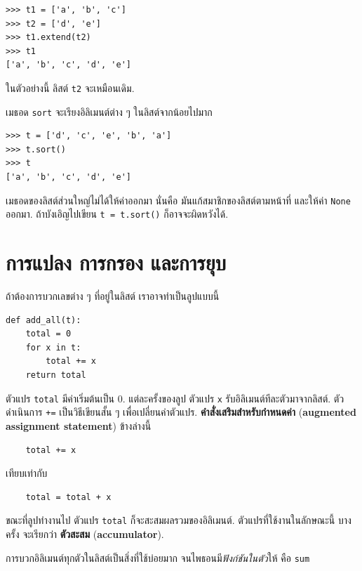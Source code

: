 \begin{verbatim}
>>> t1 = ['a', 'b', 'c']
>>> t2 = ['d', 'e']
>>> t1.extend(t2)
>>> t1
['a', 'b', 'c', 'd', 'e']
\end{verbatim}
%
ในตัวอย่างนี้ ลิสต์ \texttt{t2} จะเหมือนเดิม.

เมธอด \texttt{sort} จะเรียงอิลิเมนต์ต่าง ๆ ในลิสต์จากน้อยไปมาก

\begin{verbatim}
>>> t = ['d', 'c', 'e', 'b', 'a']
>>> t.sort()
>>> t
['a', 'b', 'c', 'd', 'e']
\end{verbatim}
%
เมธอดของลิสต์ส่วนใหญ่ไม่ได้ให้ค่าออกมา
นั่นคือ มันแก้สมาชิกของลิสต์ตามหน้าที่ และให้ค่า \texttt{None} ออกมา.
ถ้าบังเอิญไปเขียน \texttt{t = t.sort()}
ก็อาจจะผิดหวังได้.

\section{การแปลง การกรอง และการยุบ}
\label{filter}

ถ้าต้องการบวกเลขต่าง ๆ ที่อยู่ในลิสต์
เราอาจทำเป็นลูปแบบนี้


\begin{verbatim}
def add_all(t):
    total = 0
    for x in t:
        total += x
    return total
\end{verbatim}
%
ตัวแปร \texttt{total} มีค่าเริ่มต้นเป็น 0.
แต่ละครั้งของลูป
ตัวแปร \texttt{x} รับอิลิเมนต์ทีละตัวมาจากลิสต์.  
ตัวดำเนินการ \texttt{+=} เป็นวิธีเขียนสั้น ๆ เพื่อเปลี่ยนค่าตัวแปร.
\textbf{คำสั่งเสริมสำหรับกำหนดค่า} (\textbf{augmented assignment statement}) ข้างล่างนี้


\begin{verbatim}
    total += x
\end{verbatim}
%
เทียบเท่ากับ

\begin{verbatim}
    total = total + x
\end{verbatim}
%
ขณะที่ลูปทำงานไป ตัวแปร \texttt{total} ก็จะสะสมผลรวมของอิลิเมนต์.
ตัวแปรที่ใช้งานในลักษณะนี้ บางครั้ง จะเรียกว่า \textbf{ตัวสะสม} (\textbf{accumulator}).

การบวกอิลิเมนต์ทุกตัวในลิสต์เป็นสิ่งที่ใช้บ่อยมาก จนไพธอนมี\textit{ฟังก์ชันในตัว}ให้ คือ \texttt{\tt sum}

